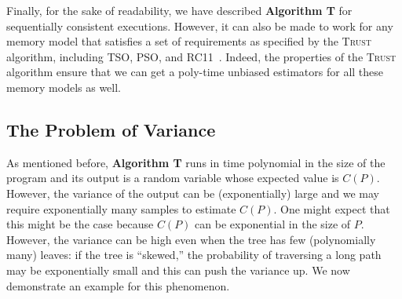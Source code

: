 \documentclass[acmsmall]{acmart}
\newcommand{\trust}{\textsc{Trust}\xspace}
\newcommand{\dpor}{\textsc{DPOR}\xspace}
\newcommand{\variance}{\operatorname{Var}}
\begin{document}
Finally, for the sake of readability, we have described \textbf{Algorithm T} for sequentially consistent executions. However, it can also be made to work for any memory model that satisfies a set of requirements as specified by the \trust algorithm, including TSO, PSO, and RC11~\cite{trust}. Indeed, the properties of the \trust algorithm ensure that we can get a poly-time unbiased estimators for all these memory models as well. 







\subsection{The Problem of Variance}

As mentioned before, \textbf{Algorithm T} runs in time polynomial in the size of the program and its output is a random variable whose
expected value is $C(P)$.
However, the variance of the output can be (exponentially) large and we may require exponentially many samples
to estimate $C(P)$.
One might expect that this might be the case because $C(P)$ can be exponential in the size of $P$. However, the variance can be high even when the tree has few (polynomially many) leaves: if the tree is ``skewed,''
the probability of traversing a long path may be exponentially small and this can push the variance up. We now demonstrate an example for this phenomenon.

\end{document}
